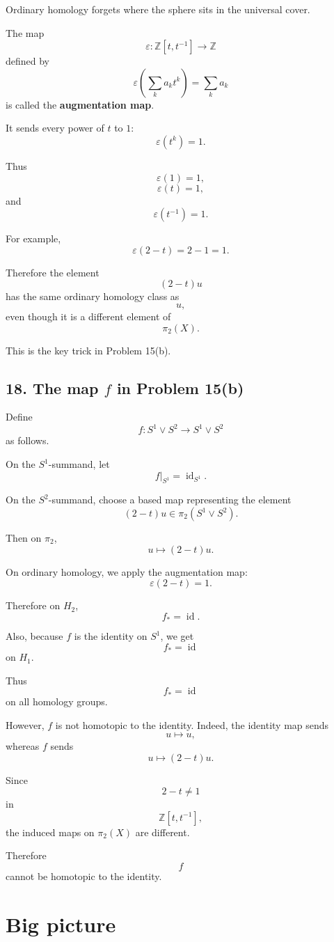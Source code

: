 \documentclass[12pt,a4paper]{article}
\theoremstyle{notespace}
\begin{document}
Ordinary homology forgets where the sphere sits in the universal cover.

The map
\[
\varepsilon:\mathbb Z[t,t^{-1}]\to \mathbb Z
\]
defined by
\[
\varepsilon\left(\sum_k a_k t^k\right)
=
\sum_k a_k
\]
is called the \textbf{augmentation map}.

It sends every power of \(t\) to \(1\):
\[
\varepsilon(t^k)=1.
\]

Thus
\[
\varepsilon(1)=1,
\]
\[
\varepsilon(t)=1,
\]
and
\[
\varepsilon(t^{-1})=1.
\]

For example,
\[
\varepsilon(2-t)=2-1=1.
\]

Therefore the element
\[
(2-t)u
\]
has the same ordinary homology class as
\[
u,
\]
even though it is a different element of
\[
\pi_2(X).
\]

This is the key trick in Problem 15(b).

\subsection*{18. The map \(f\) in Problem 15(b)}

Define
\[
f:S^1\vee S^2\to S^1\vee S^2
\]
as follows.

On the \(S^1\)-summand, let
\[
f|_{S^1}=\operatorname{id}_{S^1}.
\]

On the \(S^2\)-summand, choose a based map representing the element
\[
(2-t)u\in \pi_2(S^1\vee S^2).
\]

Then on \(\pi_2\),
\[
u\mapsto (2-t)u.
\]

On ordinary homology, we apply the augmentation map:
\[
\varepsilon(2-t)=1.
\]

Therefore on \(H_2\),
\[
f_*=\operatorname{id}.
\]

Also, because \(f\) is the identity on \(S^1\), we get
\[
f_*=\operatorname{id}
\]
on \(H_1\).

Thus
\[
f_*=\operatorname{id}
\]
on all homology groups.

However, \(f\) is not homotopic to the identity. Indeed, the identity map sends
\[
u\mapsto u,
\]
whereas \(f\) sends
\[
u\mapsto (2-t)u.
\]

Since
\[
2-t\neq 1
\]
in
\[
\mathbb Z[t,t^{-1}],
\]
the induced maps on \(\pi_2(X)\) are different.

Therefore
\[
f
\]
cannot be homotopic to the identity.

\section*{Big picture}
\end{document}
